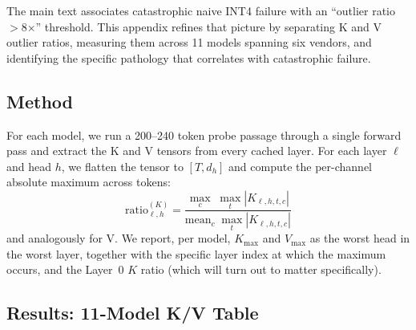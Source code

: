 \documentclass[11pt]{article}
\begin{document}
The main text associates catastrophic naive INT4 failure with an ``outlier ratio $>$8$\times$'' threshold. This appendix refines that picture by separating K and V outlier ratios, measuring them across 11 models spanning six vendors, and identifying the specific pathology that correlates with catastrophic failure.

\subsection{Method}

For each model, we run a 200--240 token probe passage through a single forward pass and extract the K and V tensors from every cached layer. For each layer $\ell$ and head $h$, we flatten the tensor to $[T, d_h]$ and compute the per-channel absolute maximum across tokens:
\[
\mathrm{ratio}^{(K)}_{\ell, h} = \frac{\max_c \; \max_t |K_{\ell, h, t, c}|}{\mathrm{mean}_c \; \max_t |K_{\ell, h, t, c}|}
\]
and analogously for V. We report, per model, $K_{\max}$ and $V_{\max}$ as the worst head in the worst layer, together with the specific layer index at which the maximum occurs, and the Layer~0 $K$ ratio (which will turn out to matter specifically).

\subsection{Results: 11-Model K/V Table}
\end{document}
